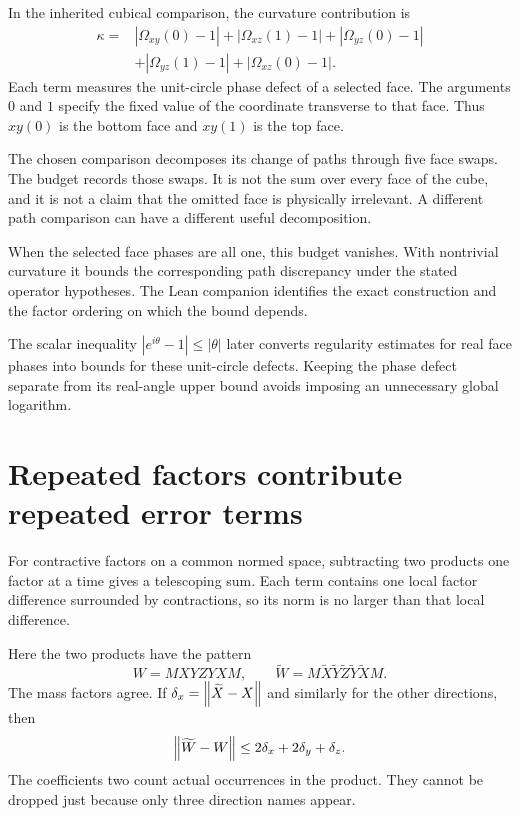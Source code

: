 In the inherited cubical comparison, the curvature contribution is
\begin{align*}
\kappa={}&|\Omega_{xy}(0)-1|+|\Omega_{xz}(1)-1|
+|\Omega_{yz}(0)-1|\\
&+|\Omega_{yz}(1)-1|+|\Omega_{xz}(0)-1|.
\end{align*}
Each term measures the unit-circle phase defect of a selected face. The arguments $0$ and $1$ specify the fixed value of the coordinate transverse to that face. Thus $xy(0)$ is the bottom face and $xy(1)$ is the top face.

The chosen comparison decomposes its change of paths through five face swaps. The budget records those swaps. It is not the sum over every face of the cube, and it is not a claim that the omitted face is physically irrelevant. A different path comparison can have a different useful decomposition.

When the selected face phases are all one, this budget vanishes. With nontrivial curvature it bounds the corresponding path discrepancy under the stated operator hypotheses. The Lean companion identifies the exact construction and the factor ordering on which the bound depends.

The scalar inequality $|e^{i\theta}-1|\leq|\theta|$ later converts regularity estimates for real face phases into bounds for these unit-circle defects. Keeping the phase defect separate from its real-angle upper bound avoids imposing an unnecessary global logarithm.



\clearpage
\section{Repeated factors contribute repeated error terms}

For contractive factors on a common normed space, subtracting two products one factor at a time gives a telescoping sum. Each term contains one local factor difference surrounded by contractions, so its norm is no larger than that local difference.

Here the two products have the pattern
\[
W=MXYZYXM,\qquad
\widetilde W=M\widetilde X\widetilde Y\widetilde Z
\widetilde Y\widetilde XM.
\]
The mass factors agree. If $\delta_x=\left\lVert\widetilde X-X\right\rVert$ and similarly for the other directions, then
\[
\left\lVert\widetilde W-W\right\rVert\leq2\delta_x+2\delta_y+\delta_z.
\]
The coefficients two count actual occurrences in the product. They cannot be dropped just because only three direction names appear.

